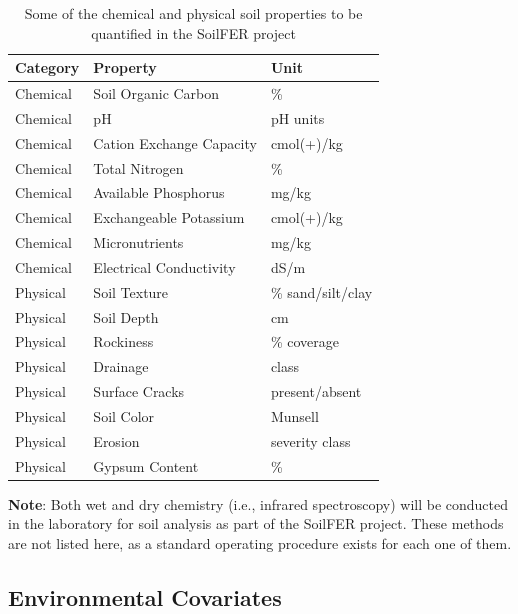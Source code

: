 \documentclass[
  10pt,
  b5paper,
  oneside]{book}
\begin{document}
\begin{table}

\caption{\label{tab:soil-properties}Some of the chemical and physical soil properties to be quantified in the SoilFER project}
\centering
\begin{tabular}[t]{l|l|l}
\hline
Category & Property & Unit\\
\hline
Chemical & Soil Organic Carbon & \%\\
\hline
Chemical & pH & pH units\\
\hline
Chemical & Cation Exchange Capacity & cmol(+)/kg\\
\hline
Chemical & Total Nitrogen & \%\\
\hline
Chemical & Available Phosphorus & mg/kg\\
\hline
Chemical & Exchangeable Potassium & cmol(+)/kg\\
\hline
Chemical & Micronutrients & mg/kg\\
\hline
Chemical & Electrical Conductivity & dS/m\\
\hline
Physical & Soil Texture & \% sand/silt/clay\\
\hline
Physical & Soil Depth & cm\\
\hline
Physical & Rockiness & \% coverage\\
\hline
Physical & Drainage & class\\
\hline
Physical & Surface Cracks & present/absent\\
\hline
Physical & Soil Color & Munsell\\
\hline
Physical & Erosion & severity class\\
\hline
Physical & Gypsum Content & \%\\
\hline
\end{tabular}
\end{table}

\textbf{Note}: Both wet and dry chemistry (i.e., infrared spectroscopy) will be conducted in the laboratory for soil analysis as part of the SoilFER project. These methods are not listed here, as a standard operating procedure exists for each one of them.

\subsection{Environmental Covariates}\label{env-covariates}
\end{document}
